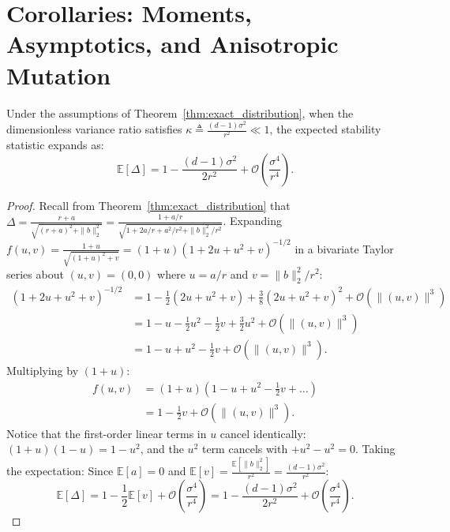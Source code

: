 \section{Corollaries: Moments, Asymptotics, and Anisotropic Mutation}
\label{sec:corollaries}

\begin{corollary}
\label{cor:small_noise}
Under the assumptions of Theorem~\ref{thm:exact_distribution}, when the dimensionless variance ratio satisfies $\kappa \triangleq \frac{(d-1)\sigma^2}{r^2} \ll 1$, the expected stability statistic expands as:
\begin{equation}
\label{eq:corrected_expansion}
\mathbb{E}[\Delta] = 1 - \frac{(d-1)\sigma^2}{2r^2} + \mathcal{O}\left( \frac{\sigma^4}{r^4} \right).
\end{equation}
\end{corollary}

\begin{proof}
Recall from Theorem~\ref{thm:exact_distribution} that $\Delta = \frac{r + a}{\sqrt{(r + a)^2 + \|b\|_2^2}} = \frac{1 + a/r}{\sqrt{1 + 2a/r + a^2/r^2 + \|b\|_2^2/r^2}}$.
Expanding $f(u, v) = \frac{1 + u}{\sqrt{(1 + u)^2 + v}} = (1 + u)(1 + 2u + u^2 + v)^{-1/2}$ in a bivariate Taylor series about $(u, v) = (0, 0)$ where $u = a/r$ and $v = \|b\|_2^2/r^2$:
\begin{align}
(1 + 2u + u^2 + v)^{-1/2} &= 1 - \frac{1}{2}(2u + u^2 + v) + \frac{3}{8}(2u + u^2 + v)^2 + \mathcal{O}(\|(u, v)\|^3) \nonumber \\
&= 1 - u - \frac{1}{2}u^2 - \frac{1}{2}v + \frac{3}{2}u^2 + \mathcal{O}(\|(u, v)\|^3) \nonumber \\
&= 1 - u + u^2 - \frac{1}{2}v + \mathcal{O}(\|(u, v)\|^3).
\end{align}
Multiplying by $(1 + u)$:
\begin{align}
f(u, v) &= (1 + u)\left( 1 - u + u^2 - \frac{1}{2}v + \dots \right) \nonumber \\
&= 1 - \frac{1}{2}v + \mathcal{O}(\|(u, v)\|^3).
\end{align}
Notice that the first-order linear terms in $u$ cancel identically: $(1+u)(1-u) = 1 - u^2$, and the $u^2$ term cancels with $+u^2 - u^2 = 0$.
Taking the expectation:
Since $\mathbb{E}[a] = 0$ and $\mathbb{E}[v] = \frac{\mathbb{E}[\|b\|_2^2]}{r^2} = \frac{(d-1)\sigma^2}{r^2}$:
\begin{equation}
\mathbb{E}[\Delta] = 1 - \frac{1}{2}\mathbb{E}[v] + \mathcal{O}\left( \frac{\sigma^4}{r^4} \right) = 1 - \frac{(d-1)\sigma^2}{2r^2} + \mathcal{O}\left( \frac{\sigma^4}{r^4} \right).
\end{equation}
\end{proof}

